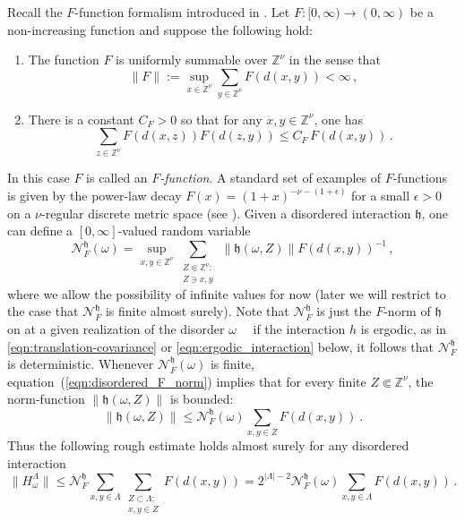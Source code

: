 \documentclass{article}
\newcommand{\calN}{\mathcal{N}^{\mathfrak{h}}_F}
\newcommand{\Znu}{\mathbb{Z}^\nu}
\newcommand{\<}{\langle}
\renewcommand{\>}{\rangle}
\newcommand{\h}{\mathfrak{h}}
\theoremstyle{definition}
\numberwithin{equation}{section}
\begin{document}
Recall the $F$-function formalism introduced in \cite{NachtergaeleOgataSims}. Let $F:[0, \infty) \to (0, \infty)$ be a non-increasing function and suppose the following hold: 
\begin{enumerate}
    \item The function $F$ is uniformly summable over $\Znu$ in the sense that 
    \[
        \|F\| := \sup_{x\in \Znu} \sum_{y\in \Znu} F(d(x,y)) <\infty\,,
    \] 
    \item There is a constant $C_F>0$ so that for any $x,y\in \Znu$, one has
    \[
        \sum_{z\in \Znu} F(d(x,z)) F(d(z,y)) \le C_F\, F(d(x,y))\,.
    \]
\end{enumerate} In this case $F$ is called an \emph{$F$-function}. A standard set of examples of $F$-functions is given by the power-law decay $F(x) = (1+x)^{-\nu - (1+\epsilon)}$ for a small $\epsilon >0$ on a $\nu$-regular discrete metric space (see \cite{NachtergaeleOgataSims}). Given a disordered interaction $\h$, one can define a $[0, \infty]$-valued random variable 
\begin{equation}\label{eqn:disordered_F_norm}
    \calN(\omega) = \sup_{x,y\in \Znu}  \sum_{\substack{Z\Subset\Znu: \\ Z\ni x,y}}\,\|\h(\omega, Z)\|F(d(x,y))^{-1}\,,
\end{equation} where we allow the possibility of infinite values for now (later we will restrict to the case that $\calN$ is finite almost surely). Note that $\calN$ is just the $F$-norm of $\h$ on at a given realization of the disorder $\omega$ \ \textemdash \ if the interaction $h$ is ergodic, as in \eqref{eqn:translation-covariance} or \eqref{eqn:ergodic_interaction} below, it follows that $\calN$ is deterministic.  Whenever $\calN(\omega)$ is finite, equation~(\ref{eqn:disordered_F_norm}) implies that for every finite $Z\Subset \Znu$, the norm-function $\|\h(\omega,Z)\|$ is bounded: 
\[
    \|\h(\omega, Z)\| \le \calN(\omega) \sum_{x,y\in Z} F(d(x,y)) \ .
\] Thus the following rough estimate holds almost surely for any disordered interaction
    \begin{equation}\label{eqn:calN_to_esssup}
        \|H^{\Lambda}_\omega\| \le \calN \sum_{x,y\in \Lambda} \sum_{\substack{Z\subset \Lambda \colon\\ x,y\in Z}}F(d(x,y)) = 2^{|\Lambda|-2}\calN(\omega) \sum_{x,y\in \Lambda}F(d(x,y))\,.
    \end{equation} 
\end{document}
